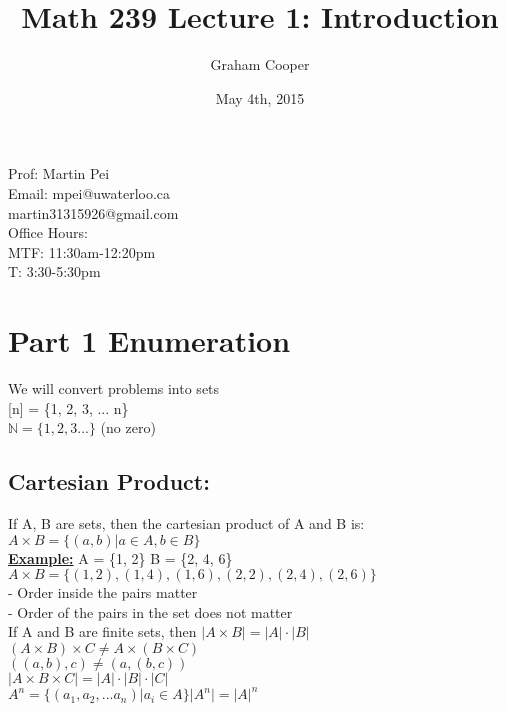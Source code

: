 \documentclass[12pt]{article}
\title{\vspace{-15ex}Math 239 Lecture 1: Introduction\vspace{-1ex}}
\date{May 4th, 2015}
\author{Graham Cooper}
\newcommand{\myt}[1]{\textbf{\underline{#1}}}
\begin{document}
	\maketitle
	Prof: 	Martin Pei\\
	Email:	mpei@uwaterloo.ca\\
			martin31315926@gmail.com\\
	Office Hours:\\
	MTF:	11:30am-12:20pm\\
	T:		3:30-5:30pm\\
	
	\section*{Part 1 Enumeration}
	
	We will convert problems into sets\\
	
	[n] = \{1, 2, 3, ... n\}\\
	
	$\mathbb{N} = \{1, 2, 3 ...\}$ (no zero)\\
	
	\subsection*{Cartesian Product:}
	If A, B are sets, then the cartesian product of A and B is:\\
	
	$A \times B = \{(a, b) | a \in A, b \in B\}$\\
	
	\myt{Example:} A = \{1, 2\}  B = \{2, 4, 6\}\\
	
	$A \times B = \{(1, 2), (1, 4), (1, 6), (2, 2), (2, 4), (2, 6)\}$\\
	- Order inside the pairs matter\\
	- Order of the pairs in the set does not matter\\
	
	If A and B are finite sets, then $|A \times B| = |A| \cdot |B|$\\
	
	$(A \times B) \times C \neq A \times(B \times C)$\\
	$((a, b), c) \neq (a, (b, c))$\\
	
	$|A \times B \times C| = |A| \cdot |B| \cdot |C|$\\
	
	$A^n = \{(a_1, a_2, ... a_n) | a_i \in A \} |A^n| = |A|^n$\\
	
\end{document}

